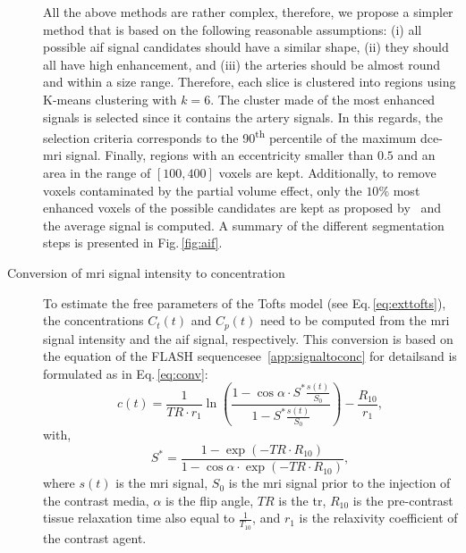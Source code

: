 \begin{description}
    All the above methods are rather complex, therefore,  we propose a simpler method that is based on the following reasonable assumptions:
    (i) all possible \ac{aif} signal candidates should have a similar shape,
    (ii) they should all have high enhancement, and
    (iii) the arteries should be almost round and within a size range.
    Therefore, each slice is clustered into regions using K-means clustering with $k=6$.
    The cluster made of the most enhanced signals is selected since it contains the artery signals.
    In this regards, the selection criteria corresponds to the 90\textsuperscript{th} percentile of the maximum \ac{dce}-\ac{mri} signal.
    Finally, regions with an eccentricity smaller than $0.5$ and an area in the range of $[100, 400]$ voxels are kept.
    Additionally, to remove voxels contaminated by the partial volume effect, only the $10\%$ most enhanced voxels of the possible candidates are kept as proposed by~\citep{schabel2008uncertainty} and the average signal is computed.
    A summary of the different segmentation steps is presented in Fig.\,\ref{fig:aif}.
    \item[Conversion of \ac{mri} signal intensity to concentration] To estimate the free parameters of the Tofts model (see Eq.\,\eqref{eq:exttofts}), the concentrations $C_t(t)$ and $C_p(t)$ need to be computed from the \ac{mri} signal intensity and the \ac{aif} signal, respectively.
      This conversion is based on the equation of the FLASH sequence\textemdash see~\ref{app:signaltoconc} for details\textemdash and is formulated as in Eq.\,\eqref{eq:conv}:
      \begin{equation}
        c(t) = \frac{1}{TR \cdot r_1} \ln\left( \frac{1 - \cos \alpha \cdot S^{*}\frac{s(t)}{S_0}}{1 - S^{*}\frac{s(t)}{S_0}} \right) - \frac{R_{10}}{r_1} ,
        \label{eq:conv}
      \end{equation}
      \noindent with,
      \begin{equation}
        S^{*} = \frac{1 - \exp(- TR \cdot R_{10})}{1 - \cos \alpha \cdot \exp(- TR \cdot R_{10})} ,
        \label{eq:sstarconv}
      \end{equation}
      \noindent where $s(t)$ is the \ac{mri} signal, $S_0$ is the \ac{mri} signal prior to the injection of the contrast media, $\alpha$ is the flip angle, $TR$ is the \acf{tr}, $R_{10}$ is the pre-contrast tissue relaxation time also equal to $\frac{1}{T_{10}}$, and $r_1$ is the relaxivity coefficient of the contrast agent.


\end{description}
